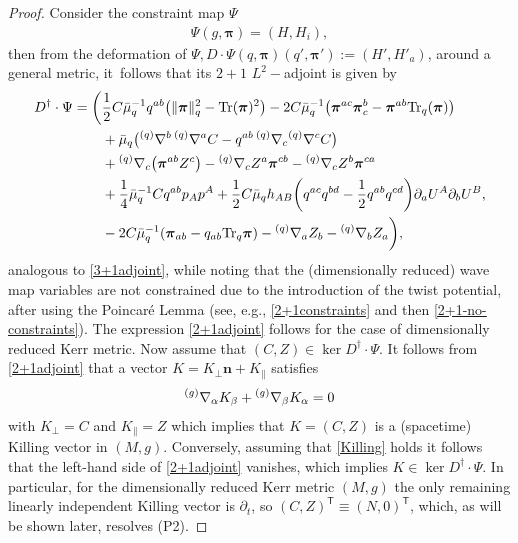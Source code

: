 \documentclass[11pt]{article}
\numberwithin{equation}{section}
\def\ptl{\partial}%
\def\mbo#1{\boldsymbol{#1}}%
\def\grad{{\nabla}}%
\newcommand{\leftexp}[2]{{\vphantom{#2}}^{#1}{#2}}
\def\halb{\frac{1}{2}}%
\def \a{\alpha}
\def \b {\beta}
\renewcommand{\a}{\alpha}
\renewcommand{\b}{\beta}
\numberwithin{equation}{section}
\begin{document}
\begin{proof}
Consider the constraint map $\Psi$
\begin{align*}
\Psi (g, \mbo{\pi}) = (H, H_i),
\end{align*}
then from the deformation of $\Psi, D \cdot \Psi (q, \mbo{\pi}) (q', \mbo{\pi}') := (H', H'_a)$, around a general metric,
it~follows that its $2+1$ $L^2-$adjoint is given by
\begin{align*} %
D^{\dagger} \cdot \Psi= \biggl(&\halb C \bar{\mu}^{-1}_q q^{ab} \bigl(\Vert \mbo{\pi} \Vert^2_q - {\rm Tr}(\mbo{\pi})^2\bigr)- 2C \bar{\mu}^{-1}_q \bigl( \mbo{\pi}^{ac} \mbo{\pi}^{b}_c - \mbo{\pi}^{ab} {\rm Tr}_q(\mbo{\pi}) \bigr) \notag\\
&{}+\bar{\mu}_q \bigl(\leftexp{(q)}{\grad}^b \,\leftexp{(q)}{\grad}^a C -q^{ab}\, \leftexp{(q)}{\grad}_c \leftexp{(q)}{\grad}^c C\bigr) \notag\\
&{}+ \leftexp{(q)}{\grad}_c\bigl(\mbo{\pi}^{ab} Z^c\bigr) - \leftexp{(q)}{\grad}_c Z^a \mbo{\pi}^{cb} - \leftexp{(q)}{\grad}_c Z^b \mbo{\pi}^{ca}\notag\\
&{}+ \frac{1}{4}\bar{\mu}_q^{-1} C q^{ab} p_A p^A + \halb C \bar{\mu}_q h_{AB} \biggl(q^{ac}q^{bd} - \halb q^{ab} q^{cd}\biggr)\ptl_a U^A \ptl_b U^B, \notag\\
&{} -2C \bar{\mu}^{-1}_q (\mbo{\pi}_{ab} - q_{ab} {\rm Tr}_q \mbo{\pi}) - \leftexp{(q)}{\grad}_a Z_b - \leftexp{(q)}{\grad}_b Z_a\biggr),
\end{align*}
analogous to \eqref{3+1adjoint}, while noting that the (dimensionally reduced) wave map variables are not constrained due to the introduction of the twist potential, after using the Poincar\'e Lemma (see, e.g., \eqref{2+1constraints} and then \eqref{2+1-no-constraints}). The expression \eqref{2+1adjoint} follows for the case of dimensionally reduced Kerr metric.
Now assume that $(C, Z) \in \operatorname{ker} D^\dagger \cdot \Psi$. It follows from \eqref{2+1adjoint} that a vector $K = K_{\perp} \mbo{n} + K_{\parallel} $
satisfies
\begin{align}\label{Killing}
\leftexp{(g)}{\grad}_\a K_\b + \leftexp{(g)}{\grad}_\b K_\a =0
\end{align}
with $K_{\perp} = C$ and $K_{\parallel} = Z$
which implies that $K = (C, Z)$ is a (spacetime) Killing vector in $(M, g)$. Conversely, assuming that \eqref{Killing} holds
it follows that the left-hand side of \eqref{2+1adjoint} vanishes, which implies $K \in \operatorname{ker} D^\dagger \cdot \Psi$. In particular, for the dimensionally reduced Kerr metric $(M,g)$ the only remaining linearly independent Killing vector is $\ptl_t$, so $(C, Z)^{\mathsf{T}} \equiv (N, 0)^{\mathsf{T}}$, which, as will be shown later, resolves (P2).
\end{proof}
\end{document}
